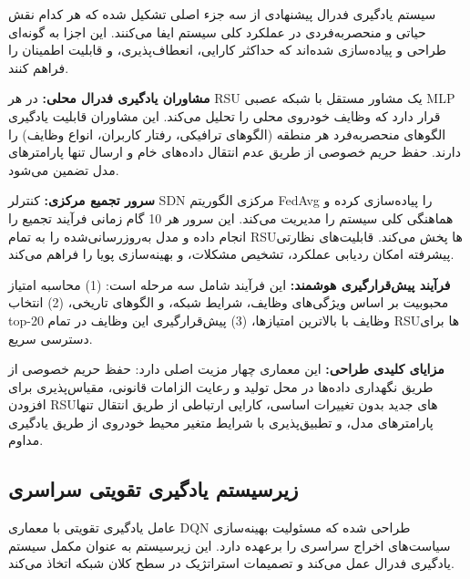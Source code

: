 \documentclass[11pt]{article}
\begin{document}
سیستم یادگیری فدرال پیشنهادی از سه جزء اصلی تشکیل شده که هر کدام نقش حیاتی و منحصربه‌فردی در عملکرد کلی سیستم ایفا می‌کنند. این اجزا به گونه‌ای طراحی و پیاده‌سازی شده‌اند که حداکثر کارایی، انعطاف‌پذیری، و قابلیت اطمینان را فراهم کنند.

\textbf{مشاوران یادگیری فدرال محلی:} در هر RSU یک مشاور مستقل با شبکه عصبی MLP قرار دارد که وظایف خودروی محلی را تحلیل می‌کند. این مشاوران قابلیت یادگیری الگوهای منحصربه‌فرد هر منطقه (الگوهای ترافیکی، رفتار کاربران، انواع وظایف) را دارند. حفظ حریم خصوصی از طریق عدم انتقال داده‌های خام و ارسال تنها پارامترهای مدل تضمین می‌شود.

\textbf{سرور تجمیع مرکزی:} کنترلر SDN مرکزی الگوریتم FedAvg را پیاده‌سازی کرده و هماهنگی کلی سیستم را مدیریت می‌کند. این سرور هر 10 گام زمانی فرآیند تجمیع را انجام داده و مدل به‌روزرسانی‌شده را به تمام RSUها پخش می‌کند. قابلیت‌های نظارتی پیشرفته امکان ردیابی عملکرد، تشخیص مشکلات، و بهینه‌سازی پویا را فراهم می‌کند.

\textbf{فرآیند پیش‌قرارگیری هوشمند:} این فرآیند شامل سه مرحله است: (1) محاسبه امتیاز محبوبیت بر اساس ویژگی‌های وظایف، شرایط شبکه، و الگوهای تاریخی، (2) انتخاب top-20 وظایف با بالاترین امتیازها، (3) پیش‌قرارگیری این وظایف در تمام RSUها برای دسترسی سریع.

\textbf{مزایای کلیدی طراحی:} این معماری چهار مزیت اصلی دارد: حفظ حریم خصوصی از طریق نگهداری داده‌ها در محل تولید و رعایت الزامات قانونی، مقیاس‌پذیری برای افزودن RSUهای جدید بدون تغییرات اساسی، کارایی ارتباطی از طریق انتقال تنها پارامترهای مدل، و تطبیق‌پذیری با شرایط متغیر محیط خودروی از طریق یادگیری مداوم.

\subsection{زیرسیستم یادگیری تقویتی سراسری}

عامل یادگیری تقویتی با معماری DQN طراحی شده که مسئولیت بهینه‌سازی سیاست‌های اخراج سراسری را برعهده دارد. این زیرسیستم به عنوان مکمل سیستم یادگیری فدرال عمل می‌کند و تصمیمات استراتژیک در سطح کلان شبکه اتخاذ می‌کند.
\end{document}
